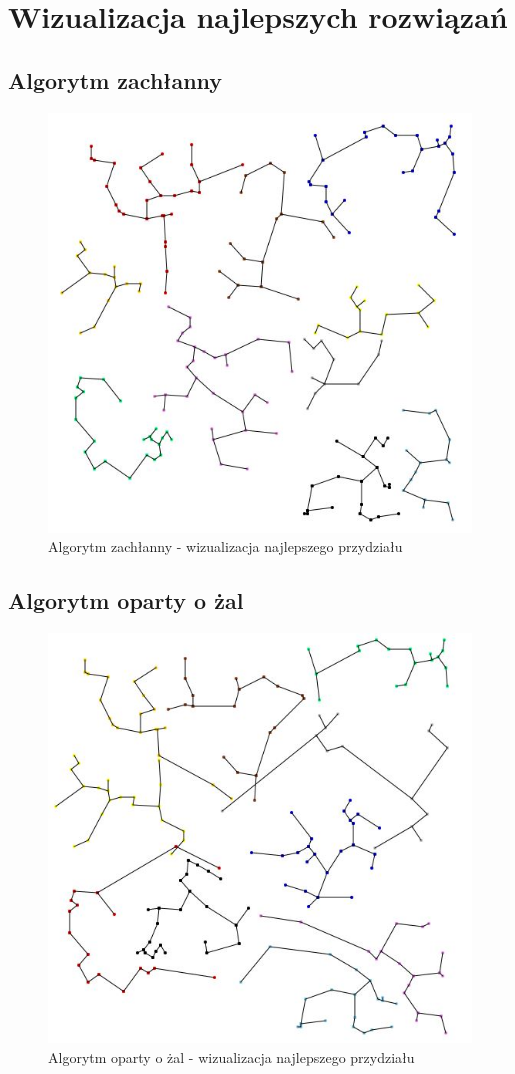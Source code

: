 \documentclass[main.tex]{subfiles}
\begin{document}
\section{Wizualizacja najlepszych rozwiązań}
\subsection{Algorytm zachłanny}
\begin{figure}[H]
    \centering
    \includegraphics[width=\textwidth]{sprawozdanie_1/zachlanny.png}
    \caption{Algorytm zachłanny - wizualizacja najlepszego przydziału}
\end{figure}

\subsection{Algorytm oparty o żal}
\begin{figure}[H]
    \centering
    \includegraphics[width=\textwidth]{sprawozdanie_1/regret.png}
    \caption{Algorytm oparty o żal - wizualizacja najlepszego przydziału}
\end{figure}
\end{document}
